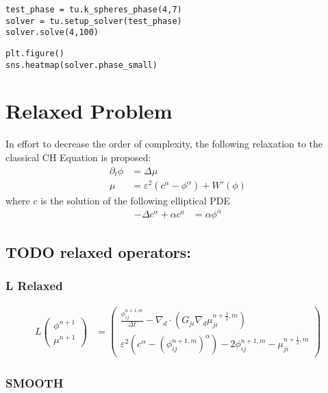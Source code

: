 \documentclass[11pt]{article}
\begin{document}
\begin{verbatim}
test_phase = tu.k_spheres_phase(4,7)
solver = tu.setup_solver(test_phase)
solver.solve(4,100)
\end{verbatim}

\begin{verbatim}
plt.figure()
sns.heatmap(solver.phase_small)
\end{verbatim}
\section{Relaxed Problem}
\label{sec:org4f5ab5b}
In effort to decrease the order of complexity, the following relaxation to the classical CH Equation is proposed:
\begin{align*}
\partial_t \phi  &= \Delta \mu \\
\mu &= \varepsilon ^2(c^\alpha - \phi^\alpha) + W'(\phi)
\end{align*}
where \(c\) is the solution of the following elliptical PDE
\begin{align*}
- \Delta c^\alpha  + \alpha c^a &= \alpha \phi ^\alpha
\end{align*}
\subsection{{\bfseries\sffamily TODO} relaxed operators:}
\label{sec:org3809522}
\subsubsection{L Relaxed}
\label{sec:org5eb5e4b}
\begin{align*}
L
\begin{pmatrix}
\phi ^{n+1} \\
\mu^{n+1}
\end{pmatrix}
&=
\begin{pmatrix}
\frac{\phi^{n+1,m}_{ij}}{\Delta t} - \nabla _d \cdot (G_{ji} \nabla _d \mu^{n + \frac{1}{2},m}_{ji}) \\
\varepsilon ^2 (c^\alpha - (\phi^{n+1,m}_{ij})^\alpha) - 2\phi ^{n+1,m}_{ij} -\mu^{n + \frac{1}{2},m}_{ji}
\end{pmatrix}
\end{align*}
\subsubsection{SMOOTH}
\label{sec:orgf81a392}
\end{document}
